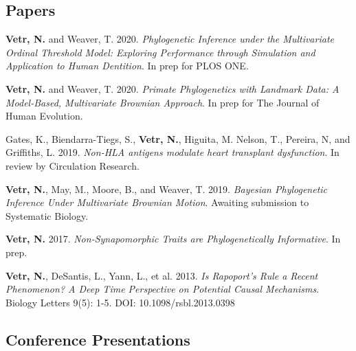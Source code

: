 \documentclass[12pt]{article}
\begin{document}
\subsection{Papers}

\begin{enumerate}[label={[\arabic*]}]

\item \textbf{Vetr, N.} and Weaver, T. 2020.  \emph{Phylogenetic Inference under the Multivariate Ordinal Threshold Model: Exploring Performance through Simulation and Application to Human Dentition}. In prep for PLOS ONE.

\item \textbf{Vetr, N.} and Weaver, T. 2020.  \emph{Primate Phylogenetics with Landmark Data: A Model-Based, Multivariate Brownian Approach}. In prep for The Journal of Human Evolution.

\item Gates, K., Biendarra-Tiegs, S., \textbf{Vetr, N.}, Higuita, M. Nelson, T., Pereira, N, and Griffiths, L. 2019.  \emph{Non-HLA antigens modulate heart transplant dysfunction}. In review by Circulation Research.

\item \textbf{Vetr, N.}, May, M., Moore, B., and Weaver, T. 2019.  \emph{Bayesian Phylogenetic Inference Under Multivariate Brownian Motion}. Awaiting submission to Systematic Biology.

\item \textbf{Vetr, N.} 2017.  \emph{Non-Synapomorphic Traits are Phylogenetically Informative}. In prep.

\item \textbf{Vetr, N.}, DeSantis, L., Yann, L., et al. 2013.  \emph{Is Rapoport’s Rule a Recent Phenomenon? A Deep Time Perspective on Potential Causal Mechanisms}. Biology Letters 9(5): 1-5. DOI: 10.1098/rsbl.2013.0398


\end{enumerate}


\subsection{Conference Presentations}
\end{document}
